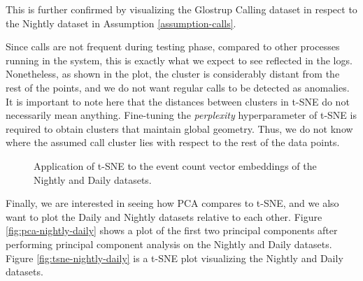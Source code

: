 This is further confirmed by visualizing the Glostrup Calling dataset in respect to the Nightly dataset in Assumption \ref{assumption-calls}.

Since calls are not frequent during testing phase, compared to other processes running in the system, this is exactly what we expect to see reflected in the logs. Nonetheless, as shown in the plot, the cluster is considerably distant from the rest of the points, and we do not want regular calls to be detected as anomalies. It is important to note here that the distances between clusters in t-SNE do not necessarily mean anything. Fine-tuning the \textit{perplexity} hyperparameter of t-SNE is required to obtain clusters that maintain global geometry. Thus, we do not know where the assumed call cluster lies with respect to the rest of the data points.

\begin{figure}%
    \centering
    \qquad
    \caption{Application of t-SNE to the event count vector embeddings of the Nightly and Daily datasets.}%
    \label{fig:tsne-single}%
\end{figure}

Finally, we are interested in seeing how PCA compares to t-SNE, and we also want to plot the Daily and Nightly datasets relative to each other. Figure \ref{fig:pca-nightly-daily} shows a plot of the first two principal components after performing principal component analysis on the Nightly and Daily datasets. Figure \ref{fig:tsne-nightly-daily} is a t-SNE plot visualizing the Nightly and Daily datasets.


